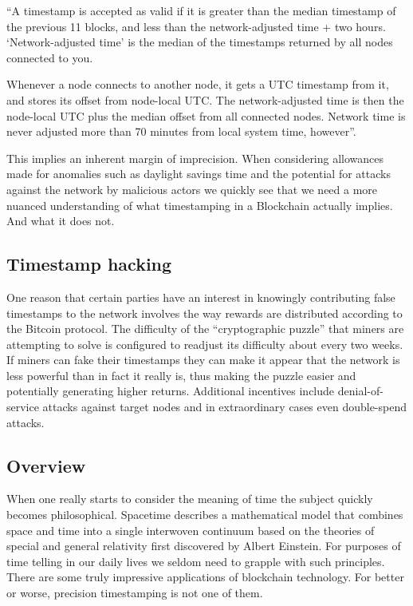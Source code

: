 \begin{displayquote}
``A timestamp is accepted as valid if it is greater than the median timestamp of the previous 11 blocks, and less than the network-adjusted time + two hours. `Network-adjusted time' is the median of the timestamps returned by all nodes connected to you.

Whenever a node connects to another node, it gets a UTC timestamp from it, and stores its offset from node-local UTC. The network-adjusted time is then the node-local UTC plus the median offset from all connected nodes. Network time is never adjusted more than 70 minutes from local system time, however''. 
\end{displayquote}

This implies an inherent margin of imprecision. When considering allowances made for anomalies such as daylight savings time and the potential for attacks against the network by malicious actors we quickly see that we need a more nuanced understanding of what timestamping in a Blockchain actually implies. And what it does not.

\subsection*{Timestamp hacking}

One reason that certain parties have an interest in knowingly contributing false timestamps to the network involves the way rewards are distributed according to the Bitcoin protocol. The difficulty of the ``cryptographic puzzle'' that miners are attempting to solve is configured to readjust its difficulty about every two weeks. If miners can fake their timestamps they can make it appear that the network is less powerful than in fact it really is, thus making the puzzle easier and potentially generating higher returns. Additional incentives include denial-of-service attacks against target nodes and in extraordinary cases even double-spend attacks.

\subsection*{Overview}

When one really starts to consider the meaning of time the subject quickly becomes philosophical. 
Spacetime describes a mathematical model that combines space and time into a single interwoven continuum based on the theories of special and general relativity first discovered by Albert Einstein. 
For purposes of time telling in our daily lives we seldom need to grapple with such principles. 
There are some truly impressive applications of blockchain technology. 
For better or worse, precision timestamping is not one of them.

